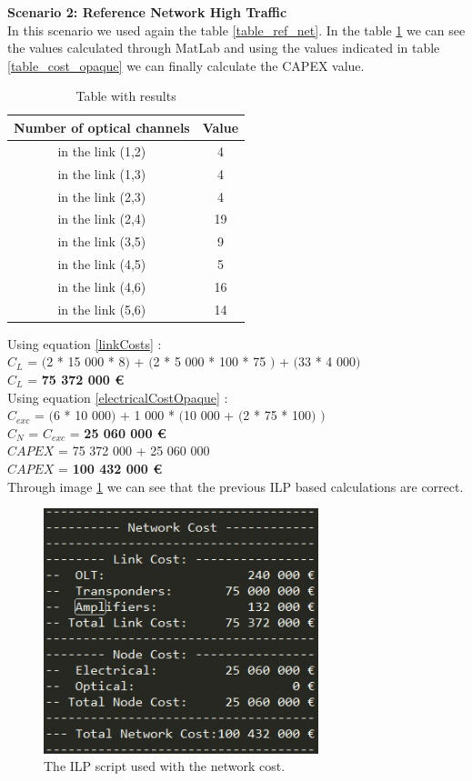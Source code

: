 \textbf{Scenario 2: Reference Network High Traffic} \label{Scenario2_opaque} \\

In this scenario we used again the table \ref{table_ref_net}. In the table \ref{result_ILP2_reference} we can see the values calculated through MatLab and using the values indicated in table \ref{table_cost_opaque} we can finally calculate the CAPEX value.
\begin{table}[h!]
\centering
\begin{tabular}{|| c | c||}
 \hline
 Number of optical channels & Value \\
 \hline\hline
 in the link (1,2) & 4 \\
 in the link (1,3) & 4 \\
 in the link (2,3) & 4 \\
 in the link (2,4) & 19 \\
 in the link (3,5) & 9 \\
 in the link (4,5) & 5 \\
 in the link (4,6) & 16 \\
 in the link (5,6) & 14 \\
 \hline
\end{tabular}
\caption{Table with results}
\label{result_ILP2_reference}
\end{table}

Using equation \ref{linkCosts} : \\
$C_L$ = $($2 * 15 000 * 8$)$ + $($2 * 5 000 * 100 * 75 $)$ + $($33 * 4 000$)$ \\
$C_L$ = \textbf{ 75 372 000 \euro} \\

Using equation \ref{electricalCostOpaque} : \\
$C_{exc}$ = $($6 * 10 000$)$ + 1 000 * $($10 000 + $($2 * 75 * 100$)$ $)$ \\
$C_N$ = $C_{exc}$ = \textbf{25 060 000 \euro} \\

$CAPEX$ = 75 372 000 + 25 060 000 \\
$CAPEX$ = \textbf{100 432 000 \euro}\\

Through image \ref{scriptopaque_surv_ref_high} we can see that the previous ILP based calculations are correct.
\begin{figure}[h!]
\centering
\includegraphics[width=8cm]{sdf/opaque/figures/script_opaque_surv_ref_high}
\caption{The ILP script used with the network cost.}
\label{scriptopaque_surv_ref_high}
\end{figure}


